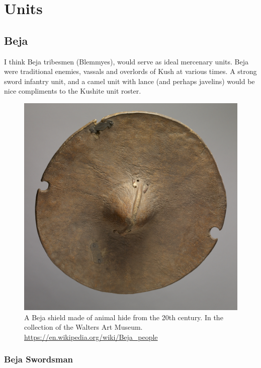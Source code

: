 \documentclass[a4paper,12pt]{scrreprt}
\begin{document}
\section{Units}

\subsection{Beja}

I think Beja tribesmen (Blemmyes), would serve as ideal mercenary units. Beja were traditional enemies, vassals and overlords of Kush at various times. A strong sword infantry unit, and a camel unit with lance (and perhaps javelins) would be nice compliments to the Kushite unit roster.

\begin{figure}[H]
	\centering
	\includegraphics[width=\textwidth]{img/beja/Beja_Shield}
	\caption{A Beja shield made of animal hide from the 20th century. In the collection of the Walters Art Museum. \url{https://en.wikipedia.org/wiki/Beja_people}}
\end{figure}

\subsubsection{Beja Swordsman}
\end{document}
